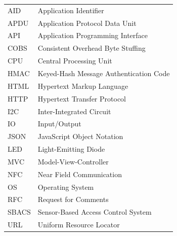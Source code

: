 \documentclass[12pt]{report}
\begin{document}



\prefaceTOC   %
\listoffigures   %
\listoftables   %

                    
    
\begin{tabular}[t]{l@{\hspace*{2cm}}l}
    AID & Application Identifier \\
    APDU & Application Protocol Data Unit \\
    API & Application Programming Interface \\
    COBS & Consistent Overhead Byte Stuffing \\
    CPU & Central Processing Unit \\
    HMAC & Keyed-Hash Message Authentication Code \\
    HTML & Hypertext Markup Language \\
    HTTP & Hypertext Transfer Protocol \\
    I2C & Inter-Integrated Circuit \\
    IO & Input/Output \\
    JSON & JavaScript Object Notation \\
    LED & Light-Emitting Diode \\
    MVC & Model-View-Controller \\
    NFC & Near Field Communication \\
    OS & Operating System \\
    RFC & Request for Comments \\
    SBACS & Sensor-Based Access Control System \\
    URL & Uniform Resource Locator \\
\end{tabular}


\endpreface
    
\end{document}

